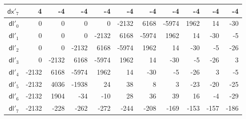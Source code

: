 \begin{table}[h]
{\begin{tabular}{r|rrrrrrrrrr}
      $\textsf{dx}'_{7}$ & 4 & -4 & -4 & -4 & -4 & -4 & -4 & -4 & -4 & -4 \\
      \hline
      $\textsf{dl}'_{0}$ & 0 & 0 & 0 & 0 & -2132 & 6168 & -5974 & 1962 & 14 & -30 \\
      $\textsf{dl}'_{1}$ & 0 & 0 & 0 & -2132 & 6168 & -5974 & 1962 & 14 & -30 & -5 \\
      $\textsf{dl}'_{2}$ & 0 & 0 & -2132 & 6168 & -5974 & 1962 & 14 & -30 & -5 & -26 \\
      $\textsf{dl}'_{3}$ & 0 & -2132 & 6168 & -5974 & 1962 & 14 & -30 & -5 & -26 & 3 \\
      $\textsf{dl}'_{4}$ & -2132 & 6168 & -5974 & 1962 & 14 & -30 & -5 & -26 & 3 & -5 \\
      $\textsf{dl}'_{5}$ & -2132 & 4036 & -1938 & 24 & 38 & 8 & 3 & -23 & -20 & -25 \\
      $\textsf{dl}'_{6}$ & -2132 & 1904 & -34 & -10 & 28 & 36 & 39 & 16 & -4 & -29 \\
      $\textsf{dl}'_{7}$ & -2132 & -228 & -262 & -272 & -244 & -208 & -169 & -153 & -157 & -186 \\
    \end{tabular}
  }
\end{table}

\clearpage

